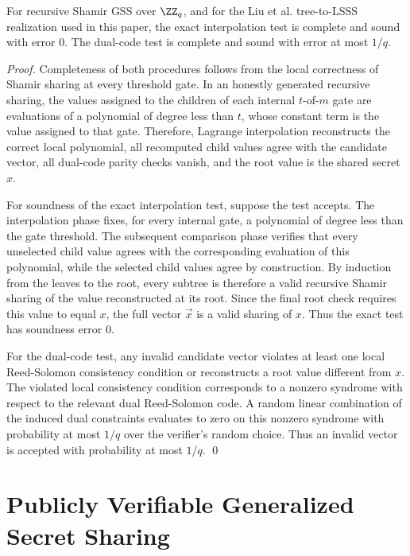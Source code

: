 \documentclass[runningheads]{llncs}
\begin{document}
\begin{lemma}\label{lem:gss_testing_soundness}
For recursive Shamir GSS over \(\ZZ_q\), and for the Liu et al. tree-to-LSSS realization used in this paper, the exact interpolation test is complete and sound with error \(0\). The dual-code test is complete and sound with error at most \(1/q\).
\end{lemma}
\begin{proof}
Completeness of both procedures follows from the local correctness of Shamir sharing at every threshold gate. In an honestly generated recursive sharing, the values assigned to the children of each internal \(t\)-of-\(m\) gate are evaluations of a polynomial of degree less than \(t\), whose constant term is the value assigned to that gate. Therefore, Lagrange interpolation reconstructs the correct local polynomial, all recomputed child values agree with the candidate vector, all dual-code parity checks vanish, and the root value is the shared secret \(x\).

For soundness of the exact interpolation test, suppose the test accepts. The interpolation phase fixes, for every internal gate, a polynomial of degree less than the gate threshold. The subsequent comparison phase verifies that every unselected child value agrees with the corresponding evaluation of this polynomial, while the selected child values agree by construction. By induction from the leaves to the root, every subtree is therefore a valid recursive Shamir sharing of the value reconstructed at its root. Since the final root check requires this value to equal \(x\), the full vector \(\vec{x}\) is a valid sharing of \(x\). Thus the exact test has soundness error \(0\).

For the dual-code test, any invalid candidate vector violates at least one local Reed-Solomon consistency condition or reconstructs a root value different from \(x\). The violated local consistency condition corresponds to a nonzero syndrome with respect to the relevant dual Reed-Solomon code. A random linear combination of the induced dual constraints evaluates to zero on this nonzero syndrome with probability at most \(1/q\) over the verifier's random choice. Thus an invalid vector is accepted with probability at most \(1/q\).
\qed
\end{proof}

\section{Publicly Verifiable Generalized Secret Sharing}
\label{sec:pvgss}
\end{document}
